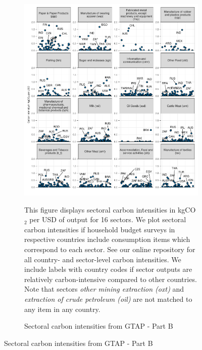 \begin{figure}[ht!]\ContinuedFloat
\begin{subfigure}[b]{\textwidth}
  \centering
  \includegraphics{Analysis_Carbon_Intensities_GTAP/Figure_2.1.1_B_2017B.pdf}
  \caption{Sectoral carbon intensities from GTAP - Part B} \label{fig:B2}  
  \begin{subcaption2}
    This figure displays sectoral carbon intensities in kgCO$_{2}$ per USD of output for 16 sectors. We plot sectoral carbon intensities if household budget surveys in respective countries include consumption items which correspond to each sector. See our online repository for all country- and sector-level carbon intensities. We include labels with country codes if sector outputs are relatively carbon-intensive compared to other countries. Note that sectors \textit{other mining extraction (oxt)} and \textit{extraction of crude petroleum (oil)} are not matched to any item in any country.
  \end{subcaption2}
\end{subfigure}
\end{figure}

\clearpage

